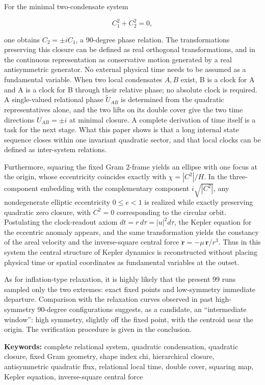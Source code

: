 \documentclass[
  a4paper,
]{article}
\begin{document}
For the minimal two-condensate system

\[
C_1^2+C_2^2=0,
\]

one obtains \(C_2=\pm iC_1\), a 90-degree phase relation. The
transformations preserving this closure can be defined as real
orthogonal transformations, and in the continuous representation as
conservative motion generated by a real antisymmetric generator. No
external physical time needs to be assumed as a fundamental variable.
When two local condensates \(A,B\) exist, B is a clock for A and A is a
clock for B through their relative phase; no absolute clock is required.
A single-valued relational phase \(\tilde U_{AB}\) is determined from
the quadratic representatives alone, and the two lifts on its double
cover give the two time directions \(U_{AB}=\pm i\) at minimal closure.
A complete derivation of time itself is a task for the next stage. What
this paper shows is that a long internal state sequence closes within
one invariant quadratic sector, and that local clocks can be defined as
inter-system relations.

Furthermore, squaring the fixed Gram 2-frame yields an ellipse with one
focus at the origin, whose eccentricity coincides exactly with
\(\chi=|C^2|/H\). In the three-component embedding with the
complementary component \(i\sqrt{|C^2|}\), any nondegenerate elliptic
eccentricity \(0\le e<1\) is realized while exactly preserving quadratic
zero closure, with \(C^2=0\) corresponding to the circular orbit.
Postulating the clock-readout axiom \(dt=r\,d\tau=|u|^2d\tau\), the
Kepler equation for the eccentric anomaly appears, and the same
transformation yields the constancy of the areal velocity and the
inverse-square central force \(\ddot{\mathbf r}=-\mu\,\mathbf r/r^3\).
Thus in this system the central structure of Kepler dynamics is
reconstructed without placing physical time or spatial coordinates as
fundamental variables at the outset.

As for inflation-type relaxation, it is highly likely that the present
99 runs sampled only the two extremes: exact fixed points and
low-symmetry immediate departure. Comparison with the relaxation curves
observed in past high-symmetry 90-degree configurations suggests, as a
candidate, an ``intermediate window'': high symmetry, slightly off the
fixed point, with the centroid near the origin. The verification
procedure is given in the conclusion.

\textbf{Keywords:} complete relational system, quadratic condensation,
quadratic closure, fixed Gram geometry, shape index chi, hierarchical
closure, antisymmetric quadratic flux, relational local time, double
cover, squaring map, Kepler equation, inverse-square central force
\end{document}
